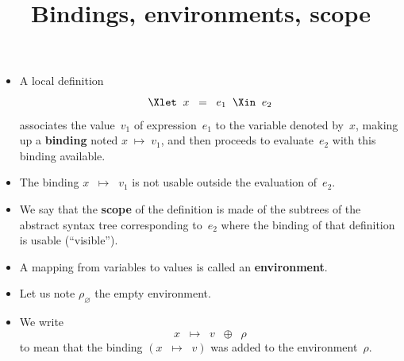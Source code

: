 \documentclass[wide]{slides}
\begin{document}
\begin{slide}
  \title{Bindings, environments, scope}

  \begin{itemize}

    \item A local definition
      \begin{equation*}
        \Xlet \;\; x \;\; = \;\; e_1 \;\; \Xin \;\; e_2
      \end{equation*}
      associates the value~\(v_1\) of expression~\(e_1\) to the
      variable denoted by~\(x\), making up a \textbf{binding} noted
      \(x \; \mapsto \; v_1\), and then proceeds to evaluate~\(e_2\)
      with this binding available.

    \item The binding \(x \;\; \mapsto \;\; v_1\) is not usable
      outside the evaluation of~\(e_2\).

    \item We say that the \textbf{scope} of the definition is made of
      the subtrees of the abstract syntax tree corresponding
      to~\(e_2\) where the binding of that definition is usable
      (``visible'').

    \item A mapping from variables to values is called an
      \textbf{environment}.

    \item Let us note \(\rho_\varnothing\) the empty environment.

    \item We write
      \begin{equation*}
        x \;\; \mapsto \;\; v \;\; \oplus \;\; \rho
      \end{equation*}
      to mean that the binding \((x \;\; \mapsto \;\; v)\) was added
      to the environment~\(\rho\).




  \end{itemize}

\end{slide}
\end{document}
